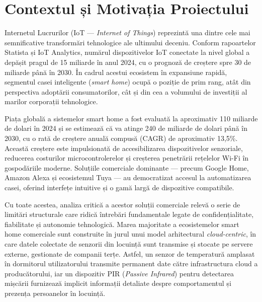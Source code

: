\documentclass[12pt, twoside, a4paper]{report}
\begin{document}
\section{Contextul și Motivația Proiectului}

Internetul Lucrurilor (IoT --- \textit{Internet of Things}) reprezintă una dintre cele
mai semnificative transformări tehnologice ale ultimului deceniu. Conform rapoartelor
Statista și IoT Analytics, numărul dispozitivelor IoT conectate la nivel global a depășit
pragul de 15 miliarde în anul 2024, cu o prognoză de creștere spre 30 de miliarde până în
2030. În cadrul acestui ecosistem în expansiune rapidă, segmentul casei inteligente
(\textit{smart home}) ocupă o poziție de prim rang, atât din perspectiva adoptării
consumatorilor, cât și din cea a volumului de investiții al marilor corporații tehnologice.

Piața globală a sistemelor smart home a fost evaluată la aproximativ 110 miliarde de
dolari în 2024 și se estimează că va atinge 240 de miliarde de dolari până în 2030, cu o
rată de creștere anuală compusă (CAGR) de aproximativ 13,5\%. Această creștere este
impulsionată de accesibilizarea dispozitivelor senzoriale, reducerea costurilor
microcontrolerelor și creșterea penetrării rețelelor Wi-Fi în gospodăriile moderne.
Soluțiile comerciale dominante --- precum Google Home, Amazon Alexa și ecosistemul
Tuya --- au democratizat accesul la automatizarea casei, oferind interfețe intuitive și o
gamă largă de dispozitive compatibile.

Cu toate acestea, analiza critică a acestor soluții comerciale relevă o serie de
limitări structurale care ridică întrebări fundamentale legate de confidențialitate,
fiabilitate și autonomie tehnologică. Marea majoritate a ecosistemelor smart home
comerciale sunt construite în jurul unui model arhitectural \textit{cloud-centric}, în
care datele colectate de senzorii din locuință sunt transmise și stocate pe servere
externe, gestionate de companii terțe. Astfel, un senzor de temperatură amplasat în
dormitorul utilizatorului transmite permanent date către infrastructura cloud a
producătorului, iar un dispozitiv PIR (\textit{Passive Infrared}) pentru detectarea
mișcării furnizează implicit informații detaliate despre comportamentul și prezența
persoanelor în locuință.
\end{document}

